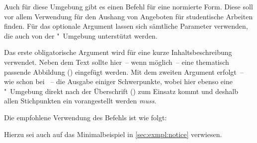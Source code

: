 \begin{DeclareEntity}{}
\begin{Declaration}
  {}
\printdeclarationlist%
%
Auch für diese Umgebung gibt es einen Befehl für eine normierte Form. Diese 
soll vor allem Verwendung für den Aushang von Angeboten für studentische 
Arbeiten finden. Für das optionale Argument lassen sich sämtliche Parameter 
verwenden, die auch von der "~Umgebung unterstützt werden.

Das erste obligatorische Argument wird für eine kurze Inhaltsbeschreibung 
verwendet. Neben dem Text sollte hier~-- wenn möglich~-- eine thematisch 
passende Abbildung () eingefügt werden. Mit dem zweiten 
Argument erfolgt~-- wie schon bei ~-- die Ausgabe einiger 
Schwerpunkte, wobei hier ebenso eine "~Umgebung direkt 
nach der Überschrift () zum Einsatz kommt und deshalb allen 
Stichpunkten ein  vorangestellt werden \emph{muss}.
\end{Declaration}
%
\begin{Example}
Die empfohlene Verwendung des Befehls  ist wie folgt:
\begin{Code}[escapechar=§]
}{%
  \item Schwerpunkt 1
  \item Schwerpunkt 2
  \item Schwerpunkt 3
}
\end{Code}
Hierzu sei auch auf das Minimalbeispiel in \autoref{sec:exmpl:notice} 
verwiesen.%
%
\end{Example}


\end{DeclareEntity}
